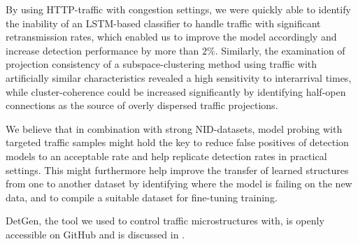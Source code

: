\documentclass[conference]{IEEEtran}
\begin{document}
By using HTTP-traffic with congestion settings, we were quickly able to identify the inability of an LSTM-based classifier to handle traffic with significant retransmission rates, which enabled us to improve the model accordingly and increase detection performance by more than $2\%$. Similarly, the examination of projection consistency of a subspace-clustering method using traffic with artificially similar characteristics revealed a high sensitivity to interarrival times, while cluster-coherence could be increased significantly by identifying half-open connections as the source of overly dispersed traffic projections. 

We believe that in combination with strong NID-datasets, model probing with targeted traffic samples might hold the key to reduce false positives of detection models to an acceptable rate and help replicate detection rates in practical settings. This might furthermore help improve the transfer of learned structures from one to another dataset by identifying where the model is failing on the new data, and to compile a suitable dataset for fine-tuning training.

DetGen, the tool we used to control traffic microstructures with, is openly accessible on GitHub and is discussed in \cite{clausen2020traffic}. 


\end{document}
